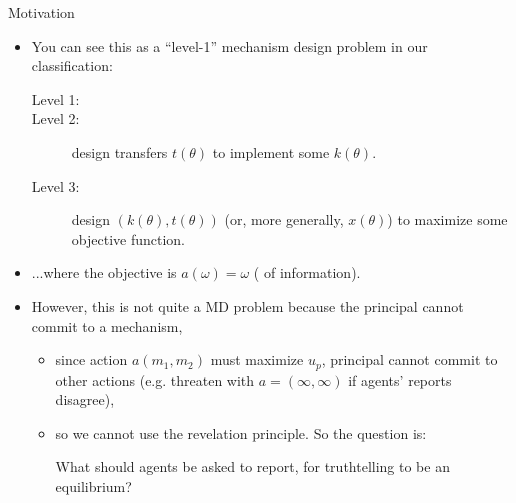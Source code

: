 \documentclass[english,10pt
,aspectratio=169
]{beamer}
\begin{document}
\begin{frame}{Motivation}
\begin{itemize}
	\item You can see this as a ``level-1'' mechanism design problem in our classification:
	{\footnotesize 
	\begin{description}
		\item[Level 1:] 
		\item[Level 2:] design transfers $t(\theta)$ to implement some $k(\theta)$.
		\item[Level 3:] design $(k(\theta),t(\theta))$ (or, more generally, $x(\theta)$) to maximize some objective function.
	\end{description}
	}
	\item ...where the objective is $a(\omega) = \omega$ ( of information).
	\item However, this is not quite a MD problem because the principal \alert{cannot commit} to a mechanism,
	\begin{itemize}
		\item since action $a(m_1,m_2)$ must maximize $u_p$, principal cannot commit to other actions (e.g. threaten with $a=(\infty,\infty)$ if agents' reports disagree),
		\item so we cannot use the revelation principle. So the question is:
		\begin{block}{}
			\alert{What} should agents be asked to report, for truthtelling to be an equilibrium?
		\end{block}
	\end{itemize}
\end{itemize}
\end{frame}
\end{document}
